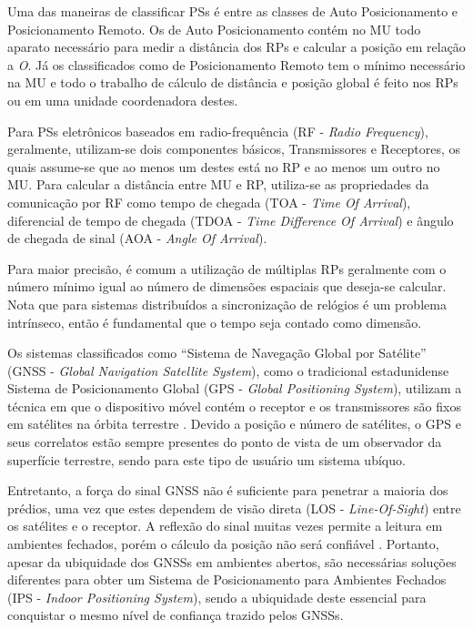 Uma das maneiras de classificar PSs é entre as classes de Auto Posicionamento e
Posicionamento Remoto. Os de Auto Posicionamento contém no MU todo aparato
necessário para medir a distância dos RPs e calcular a posição em relação a
\emph{O}. Já os classificados como de Posicionamento Remoto tem o mínimo
necessário na MU e todo o trabalho de cálculo de distância e posição global é
feito nos RPs ou em uma unidade coordenadora destes.

Para PSs eletrônicos baseados em radio-frequência (RF - \emph{Radio
Frequency}), geralmente, utilizam-se dois componentes básicos, Transmissores e
Receptores, os quais assume-se que ao menos um destes está no RP e ao menos um
outro no MU. Para calcular a distância entre MU e RP, utiliza-se as propriedades
da comunicação por RF como tempo de chegada (TOA - \emph{Time Of Arrival}),
diferencial de tempo de chegada (TDOA - \emph{Time Difference Of Arrival}) e
ângulo de chegada de sinal (AOA - \emph{Angle Of Arrival}).

Para maior precisão, é comum a utilização de múltiplas RPs geralmente com o
número mínimo igual ao número de dimensões espaciais que deseja-se calcular.
Nota que para sistemas distribuídos a sincronização de relógios é um problema
intrínseco, então é fundamental que o tempo seja contado como dimensão.

Os sistemas classificados como ``Sistema de Navegação Global por Satélite''
(GNSS - \emph{Global Navigation Satellite System}), como o tradicional
estadunidense Sistema de Posicionamento Global (GPS - \emph{Global Positioning
System}), utilizam a técnica em que o dispositivo móvel contém o receptor e os
transmissores são fixos em satélites na órbita terrestre \cite{Djuknic2001}.
Devido a posição e número de satélites, o GPS e seus correlatos estão sempre
presentes do ponto de vista de um observador da superfície terrestre, sendo para
este tipo de usuário um sistema ubíquo.

Entretanto, a força do sinal GNSS não é suficiente para penetrar a maioria dos
prédios, uma vez que estes dependem de visão direta (LOS -
\emph{Line-Of-Sight}) entre os satélites e o receptor. A reflexão do sinal
muitas vezes permite a leitura em ambientes fechados, porém o cálculo da posição
não será confiável \cite{Chen2000}. Portanto, apesar da ubiquidade dos
GNSSs em ambientes abertos, são necessárias soluções diferentes para obter um
Sistema de Posicionamento para Ambientes Fechados (IPS - \emph{Indoor
Positioning System}), sendo a ubiquidade deste essencial para conquistar o mesmo
nível de confiança trazido pelos GNSSs.

